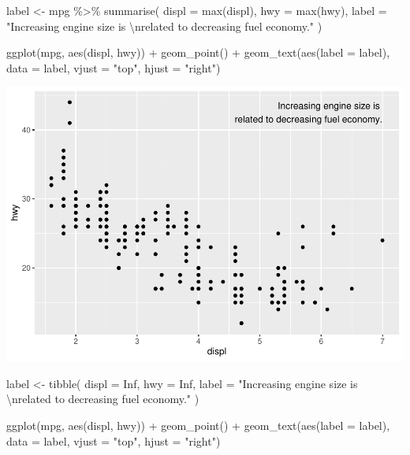 \documentclass[
]{article}
\newenvironment{Shaded}{\begin{snugshade}}{\end{snugshade}}
\newcommand{\AttributeTok}[1]{\textcolor[rgb]{0.77,0.63,0.00}{#1}}
\newcommand{\ConstantTok}[1]{\textcolor[rgb]{0.00,0.00,0.00}{#1}}
\newcommand{\FunctionTok}[1]{\textcolor[rgb]{0.00,0.00,0.00}{#1}}
\newcommand{\NormalTok}[1]{#1}
\newcommand{\OtherTok}[1]{\textcolor[rgb]{0.56,0.35,0.01}{#1}}
\newcommand{\SpecialCharTok}[1]{\textcolor[rgb]{0.00,0.00,0.00}{#1}}
\newcommand{\StringTok}[1]{\textcolor[rgb]{0.31,0.60,0.02}{#1}}
\begin{document}
\begin{Shaded}
\begin{Highlighting}[]
\NormalTok{label }\OtherTok{\textless{}{-}}\NormalTok{ mpg }\SpecialCharTok{\%\textgreater{}\%}
  \FunctionTok{summarise}\NormalTok{(}
    \AttributeTok{displ =} \FunctionTok{max}\NormalTok{(displ),}
    \AttributeTok{hwy =} \FunctionTok{max}\NormalTok{(hwy),}
    \AttributeTok{label =} \StringTok{"Increasing engine size is }\SpecialCharTok{\textbackslash{}n}\StringTok{related to decreasing fuel economy."}
\NormalTok{  )}

\FunctionTok{ggplot}\NormalTok{(mpg, }\FunctionTok{aes}\NormalTok{(displ, hwy)) }\SpecialCharTok{+}
  \FunctionTok{geom\_point}\NormalTok{() }\SpecialCharTok{+}
  \FunctionTok{geom\_text}\NormalTok{(}\FunctionTok{aes}\NormalTok{(}\AttributeTok{label =}\NormalTok{ label), }\AttributeTok{data =}\NormalTok{ label, }\AttributeTok{vjust =} \StringTok{"top"}\NormalTok{, }\AttributeTok{hjust =} \StringTok{"right"}\NormalTok{)}
\end{Highlighting}
\end{Shaded}

\includegraphics{Journal_files/figure-latex/unnamed-chunk-53-2.pdf}

\begin{Shaded}
\begin{Highlighting}[]
\NormalTok{label }\OtherTok{\textless{}{-}} \FunctionTok{tibble}\NormalTok{(}
  \AttributeTok{displ =} \ConstantTok{Inf}\NormalTok{,}
  \AttributeTok{hwy =} \ConstantTok{Inf}\NormalTok{,}
  \AttributeTok{label =} \StringTok{"Increasing engine size is }\SpecialCharTok{\textbackslash{}n}\StringTok{related to decreasing fuel economy."}
\NormalTok{)}

\FunctionTok{ggplot}\NormalTok{(mpg, }\FunctionTok{aes}\NormalTok{(displ, hwy)) }\SpecialCharTok{+}
  \FunctionTok{geom\_point}\NormalTok{() }\SpecialCharTok{+}
  \FunctionTok{geom\_text}\NormalTok{(}\FunctionTok{aes}\NormalTok{(}\AttributeTok{label =}\NormalTok{ label), }\AttributeTok{data =}\NormalTok{ label, }\AttributeTok{vjust =} \StringTok{"top"}\NormalTok{, }\AttributeTok{hjust =} \StringTok{"right"}\NormalTok{)}
\end{Highlighting}
\end{Shaded}
\end{document}
